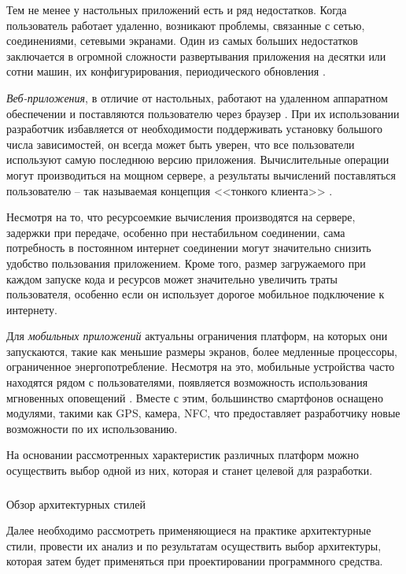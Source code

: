 Тем не менее у настольных приложений есть и ряд недостатков. Когда пользователь работает удаленно, возникают проблемы, связанные с сетью, соединениями, сетевыми экранами. Один из самых больших недостатков заключается в огромной сложности развертывания приложения на десятки или сотни машин, их конфигурирования, периодического обновления \cite{msdn_desktop_vs_web}.

\emph{Веб-приложения}, в отличие от настольных, работают на удаленном аппаратном обеспечении и поставляются пользователю через браузер \cite{web_based_vs_desktop}. При их использовании разработчик избавляется от необходимости поддерживать установку большого числа зависимостей, он всегда может быть уверен, что все пользователи используют самую последнюю версию приложения. Вычислительные операции могут производиться на мощном сервере, а результаты вычислений поставляться пользователю -- так называемая концепция <<тонкого клиента>> \cite{desktop_vs_web_deeper_look}.

Несмотря на то, что ресурсоемкие вычисления производятся на сервере, задержки при передаче, особенно при нестабильном соединении, сама потребность в постоянном интернет соединении могут значительно снизить удобство пользования приложением. Кроме того, размер загружаемого при каждом запуске кода и ресурсов может значительно увеличить траты пользователя, особенно если он использует дорогое мобильное подключение к интернету.

Для \emph{мобильных приложений} актуальны ограничения платформ, на которых они запускаются, такие как меньшие размеры экранов, более медленные процессоры, ограниченное энергопотребление. Несмотря на это, мобильные устройства часто находятся рядом с пользователями, появляется возможность использования мгновенных оповещений \cite{desktop_mobile_differences}. Вместе с этим, большинство смартфонов оснащено модулями, такими как GPS, камера, NFC, что пре\-дос\-тав\-ля\-ет разработчику новые возможности по их использованию.

На основании рассмотренных характеристик различных платформ можно осуществить выбор одной из них, которая и станет целевой для разработки.

\subsubsection{} Обзор архитектурных стилей
\label{sec:analysis:literature:architecture}

Далее необходимо рассмотреть применяющиеся на практике архитектурные стили, провести их анализ и по результатам осуществить выбор архитектуры, которая затем будет применяться при проектировании программного средства.

